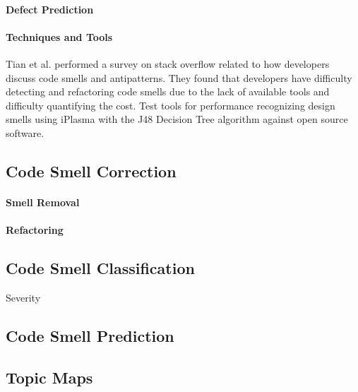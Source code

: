 \documentclass[conference]{IEEEtran}
\begin{document}
\paragraph{Defect Prediction}
\paragraph{Techniques and Tools}
Tian et al.\cite{tian_how_2019} performed a survey on stack overflow related to how developers discuss code smells and antipatterns. 
They found that developers have difficulty detecting and refactoring code smells due to the lack of available tools and difficulty quantifying the cost.
Test tools for performance recognizing design smells using iPlasma with the J48 Decision Tree algorithm\cite{singh_systematic_2018} against open source software.
\subsection{Code Smell Correction}
\paragraph{Smell Removal}
\paragraph{Refactoring}
\subsection{Code Smell Classification}
Severity
\subsection{Code Smell Prediction}

\subsection{Topic Maps}
\end{document}
